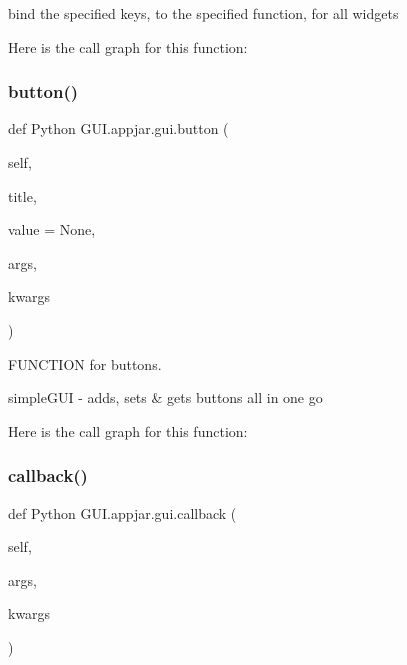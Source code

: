 \begin{DoxyVerb}bind the specified keys, to the specified function, for all widgets \end{DoxyVerb}
 Here is the call graph for this function\+:
\mbox{\label{class_python_01_g_u_i_1_1appjar_1_1gui_aa8810c60c820b8b3eb5c8647a88a1b05}} 
\subsubsection{\texorpdfstring{button()}{button()}}
{\footnotesize\ttfamily def Python G\+U\+I.\+appjar.\+gui.\+button (\begin{DoxyParamCaption}\item[{}]{self,  }\item[{}]{title,  }\item[{}]{value = {\ttfamily None},  }\item[{}]{args,  }\item[{}]{kwargs }\end{DoxyParamCaption})}



F\+U\+N\+C\+T\+I\+ON for buttons. 

\begin{DoxyVerb}simpleGUI - adds, sets & gets buttons all in one go \end{DoxyVerb}
 Here is the call graph for this function\+:
\mbox{\label{class_python_01_g_u_i_1_1appjar_1_1gui_aa23620962e130effb8dc9dd15198cd50}} 
\subsubsection{\texorpdfstring{callback()}{callback()}}
{\footnotesize\ttfamily def Python G\+U\+I.\+appjar.\+gui.\+callback (\begin{DoxyParamCaption}\item[{}]{self,  }\item[{}]{args,  }\item[{}]{kwargs }\end{DoxyParamCaption})}

